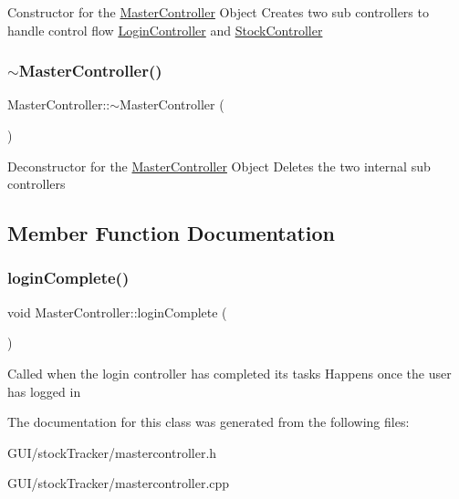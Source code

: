 Constructor for the \mbox{\hyperlink{class_master_controller}{Master\+Controller}} Object Creates two sub controllers to handle control flow \mbox{\hyperlink{class_login_controller}{Login\+Controller}} and \mbox{\hyperlink{class_stock_controller}{Stock\+Controller}} \mbox{\label{class_master_controller_a1224d024402d36a61e9bd7b89f434388}} 
\subsubsection{\texorpdfstring{$\sim$\+Master\+Controller()}{~MasterController()}}
{\footnotesize\ttfamily Master\+Controller\+::$\sim$\+Master\+Controller (\begin{DoxyParamCaption}{ }\end{DoxyParamCaption})}

Deconstructor for the \mbox{\hyperlink{class_master_controller}{Master\+Controller}} Object Deletes the two internal sub controllers 

\subsection{Member Function Documentation}
\mbox{\label{class_master_controller_adb9bf0a49dd9010217c47834a98ec184}} 
\subsubsection{\texorpdfstring{login\+Complete()}{loginComplete()}}
{\footnotesize\ttfamily void Master\+Controller\+::login\+Complete (\begin{DoxyParamCaption}{ }\end{DoxyParamCaption})}

Called when the login controller has completed its tasks Happens once the user has logged in 

The documentation for this class was generated from the following files\+:\begin{DoxyCompactItemize}
\item 
G\+U\+I/stock\+Tracker/mastercontroller.\+h\item 
G\+U\+I/stock\+Tracker/mastercontroller.\+cpp\end{DoxyCompactItemize}
